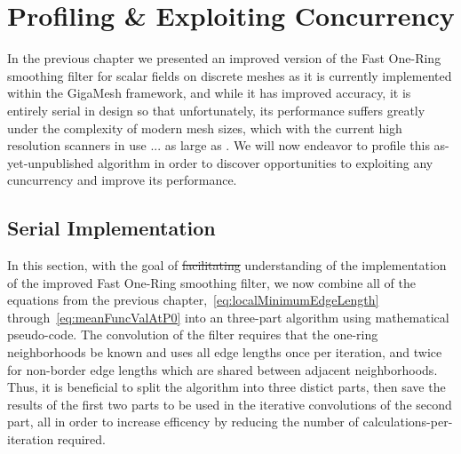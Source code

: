 \chapter{Profiling \& Exploiting Concurrency}
In the previous chapter we presented an improved version of the Fast One-Ring smoothing filter for scalar fields on discrete meshes as it is currently implemented within the GigaMesh framework, and while it has improved accuracy, it is entirely serial in design so that unfortunately, its performance suffers greatly under the complexity of modern mesh sizes, which with the current high resolution scanners in use ... as large as . We will now endeavor to profile this as-yet-unpublished algorithm in order to discover opportunities to exploiting any cuncurrency and improve its performance.
%
\section{Serial Implementation}
\label{cFPECsSI}
In this section, with the goal of \sout{facilitating} understanding of the implementation of the improved Fast One-Ring smoothing filter, we now combine all of the equations from the previous chapter,~\ref{eq:localMinimumEdgeLength} through~\ref{eq:meanFuncValAtP0} into an three-part algorithm using mathematical pseudo-code.  The convolution of the filter requires that the one-ring neighborhoods be known and uses all edge lengths once per iteration, and twice for non-border edge lengths which are shared between adjacent neighborhoods. Thus, it is beneficial to split the algorithm into three distict parts, then save the results of the first two parts to be used in the iterative convolutions of the second part, all in order to increase efficency by reducing the number of calculations-per-iteration required.
%
